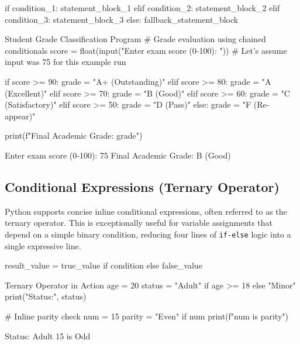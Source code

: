 \begin{syntaxbox}
if condition\_1:
    statement\_block\_1
elif condition\_2:
    statement\_block\_2
elif condition\_3:
    statement\_block\_3
else:
    fallback\_statement\_block
\end{syntaxbox}

\begin{pythoncode}{Student Grade Classification Program}
# Grade evaluation using chained conditionals
score = float(input("Enter exam score (0-100): "))
# Let's assume input was 75 for this example run

if score >= 90:
    grade = "A+ (Outstanding)"
elif score >= 80:
    grade = "A (Excellent)"
elif score >= 70:
    grade = "B (Good)"
elif score >= 60:
    grade = "C (Satisfactory)"
elif score >= 50:
    grade = "D (Pass)"
else:
    grade = "F (Re-appear)"

print(f"Final Academic Grade: {grade}")
\end{pythoncode}
\begin{outputbox}
Enter exam score (0-100): 75
Final Academic Grade: B (Good)
\end{outputbox}

\subsection{Conditional Expressions (Ternary Operator)}
Python supports concise inline conditional expressions, often referred to as the ternary operator. This is exceptionally useful for variable assignments that depend on a simple binary condition, reducing four lines of \texttt{if-else} logic into a single expressive line.

\begin{syntaxbox}
result\_value = true\_value if condition else false\_value
\end{syntaxbox}

\begin{pythoncode}{Ternary Operator in Action}
age = 20
status = "Adult" if age >= 18 else "Minor"
print("Status:", status)

# Inline parity check
num = 15
parity = "Even" if num %
print(f"{num} is {parity}")
\end{pythoncode}
\begin{outputbox}
Status: Adult
15 is Odd
\end{outputbox}


